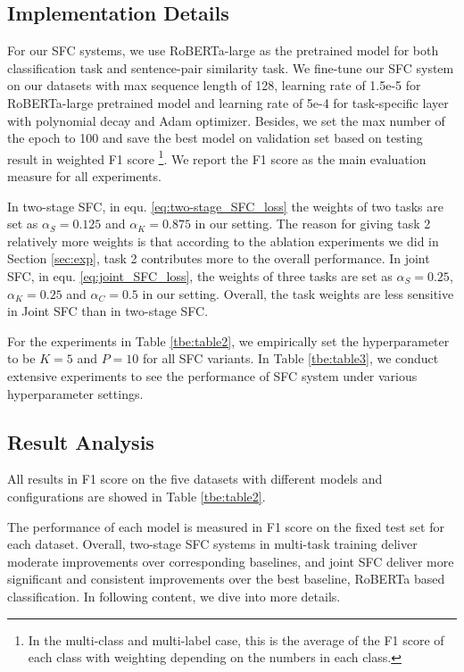 \subsection{Implementation Details}
For  our  SFC  systems,  we  use RoBERTa-large as the pretrained model for both
classification  task  and  sentence-pair similarity task. We fine-tune
our  SFC  system  on  our datasets with max sequence length of 128,
learning  rate  of 1.5e-5 for RoBERTa-large pretrained model and learning rate
of  5e-4  for  task-specific  layer  with polynomial decay and Adam optimizer.
Besides,  we  set  the  max number of the epoch to 100 and save the best model on
validation  set based on testing result in weighted F1 score
\footnote{In the multi-class and multi-label case, this is the average of the
F1 score of each class with weighting depending on the numbers in each class.}.
We report the F1 score as the main evaluation measure for all experiments.

In two-stage SFC, in equ. \ref{eq:two-stage_SFC_loss} the weights of two tasks
are  set  as  $\alpha_S=0.125$ and $\alpha_K=0.875$ in our setting. The reason
for  giving  task  2 relatively more weights is that according to the ablation
experiments  we  did  in Section \ref{sec:exp}, task 2 contributes more to the
overall  performance.  In  joint  SFC,  in  equ.  \ref{eq:joint_SFC_loss}, the
weights  of  three  tasks  are  set  as  $\alpha_S=0.25$,  $\alpha_K=0.25$ and
$\alpha_C=0.5$  in  our setting. Overall, the task weights are less sensitive
in Joint SFC than in two-stage SFC.

For  the  experiments  in  Table  \ref{tbe:table2},  we  empirically  set  the
hyperparameter  to  be  $K=5$  and  $P=10$  for  all  SFC  variants.  In Table
\ref{tbe:table3},  we  conduct extensive experiments to see the performance of
SFC system under various hyperparameter settings.

\subsection{Result Analysis}
All  results  in  F1  score  on  the  five  datasets with different models and
configurations are showed in Table \ref{tbe:table2}.

The performance of each model is measured in F1 score on the fixed
test  set  for  each  dataset.  
Overall,  two-stage  SFC systems in multi-task training deliver  moderate 
improvements  over  corresponding baselines, and joint SFC deliver more
significant and consistent improvements over the best baseline, RoBERTa based
classification. In following content, we dive into more details.

